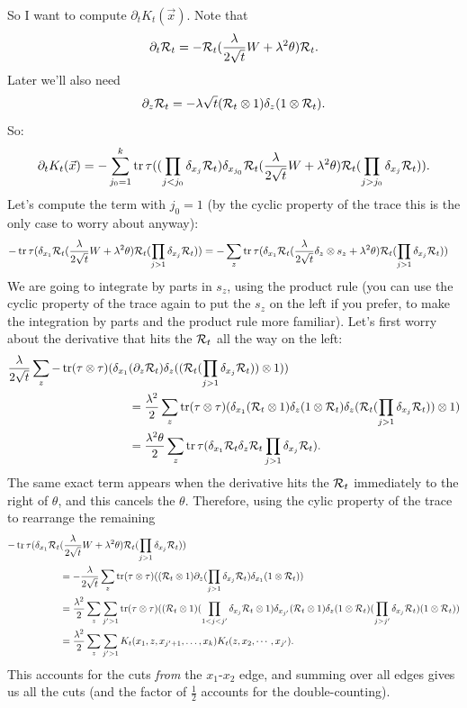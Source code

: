 \documentclass[11pt]{amsart}
\begin{document}
So I want to compute $\partial_t K_t(\vec{x})$.  Note that
\[
\partial_t {\mathcal{R}}_t = - {\mathcal{R}}_t (\frac{\lambda}{2\sqrt{t}}W + \lambda^2\theta)
{\mathcal{R}}_t.
\]
Later we'll also need
\[
\partial_z {\mathcal{R}}_t = -\lambda \sqrt{t} ({\mathcal{R}}_t \otimes 1) \delta_z (1\otimes {\mathcal{R}}_t).
\]
So:
\begin{align*}
\partial_t K_t(\vec{x})
= -\sum_{j_0=1}^k
\operatorname{tr} \tau( (\prod_{j<j_0} \delta_{x_j}{\mathcal{R}}_t)
\delta_{x_{j_0}} {\mathcal{R}}_t (\frac{\lambda}{2\sqrt{t}} W + \lambda^2\theta){\mathcal{R}}_t
(\prod_{j>j_0} \delta_{x_j} {\mathcal{R}}_t)).
\end{align*}
Let's compute the term with $j_0=1$ (by the cyclic property of the trace this is the
only case to worry about anyway):
\begin{align*}
-\operatorname{tr} \tau (\delta_{x_1} {\mathcal{R}}_t (\frac{\lambda}{2\sqrt{t}}W + \lambda^2 \theta)
{\mathcal{R}}_t (\prod_{j>1} \delta_{x_j}{\mathcal{R}}_t)) &=
- \sum_z \operatorname{tr}\tau(\delta_{x_1} {\mathcal{R}}_t (\frac{\lambda}{2\sqrt{t}}\delta_z\otimes s_z
+ \lambda^2 \theta) {\mathcal{R}}_t (\prod_{j>1} \delta_{x_j} {\mathcal{R}}_t))
\end{align*}
We are going to integrate by parts in $s_z$, using the product rule
(you can use the cyclic property of the trace again to put the $s_z$ on the left if you
prefer, to make the integration by parts and the product rule more familiar).
Let's first worry about the derivative that hits the ${\mathcal{R}}_t$ all the way on the
left:
\begin{align*}
\frac{\lambda}{2\sqrt{t}}
\sum_z
-\operatorname{tr} (\tau\otimes\tau) (\delta_{x_1} &(\partial_z{\mathcal{R}}_t) \delta_z
(({\mathcal{R}}_t (\prod_{j>1} \delta_{x_j}{\mathcal{R}}_t))\otimes 1))  \\
&= \frac{\lambda^2}{2} \sum_z \operatorname{tr}(\tau\otimes \tau)
(\delta_{x_1}({\mathcal{R}}_t\otimes 1) \delta_z (1\otimes {\mathcal{R}}_t) \delta_z ({\mathcal{R}}_t (\prod_{j>1} \delta_{x_j}{\mathcal{R}}_t))\otimes 1) \\
&= \frac{\lambda^2\theta}{2} \sum_z \operatorname{tr} \tau(\delta_{x_1}{\mathcal{R}}_t \delta_z {\mathcal{R}}_t
\prod_{j>1} \delta_{x_j} {\mathcal{R}}_t).
\end{align*}
The same exact term appears when the derivative hits the ${\mathcal{R}}_t$ immediately to
the right of $\theta$, and this cancels the $\theta$.  Therefore, using
the cylic property of the trace to rearrange the remaining
\begin{align*}
-\operatorname{tr} \tau (\delta_{x_1} {\mathcal{R}}_t &(\frac{\lambda}{2\sqrt{t}}W + \lambda^2 \theta)
{\mathcal{R}}_t (\prod_{j>1} \delta_{x_j}{\mathcal{R}}_t))\\
&=-\frac{\lambda}{2\sqrt{t}}\sum_z
\operatorname{tr}(\tau\otimes \tau)
(({\mathcal{R}}_t\otimes 1) \partial_z(\prod_{j>1} \delta_{x_j}{\mathcal{R}}_t) \delta_{x_1}(1\otimes {\mathcal{R}}_t)) \\
&= \frac{\lambda^2}{2}
\sum_z \sum_{j'>1} \operatorname{tr}(\tau\otimes \tau)
(({\mathcal{R}}_t\otimes 1) (\prod_{1<j<j'} \delta_{x_j}{\mathcal{R}}_t \otimes 1)
\delta_{x_{j'}}
({\mathcal{R}}_t\otimes 1) \delta_z (1\otimes {\mathcal{R}}_t) (\prod_{j>j'} \delta_{x_j}{\mathcal{R}}_t) ( 1\otimes {\mathcal{R}}_t)) \\
&= \frac{\lambda^2}{2} \sum_z \sum_{j'>1}K_t(x_1,z,x_{j'+1},\dots,x_k)
K_t(z,x_2,\cdots,x_{j'}).
\end{align*}
This accounts for the cuts \textit{from} the $x_1$-$x_2$ edge, and summing over all
edges gives us all the cuts (and the factor of $\frac12$ accounts for the double-counting).
\end{document}

